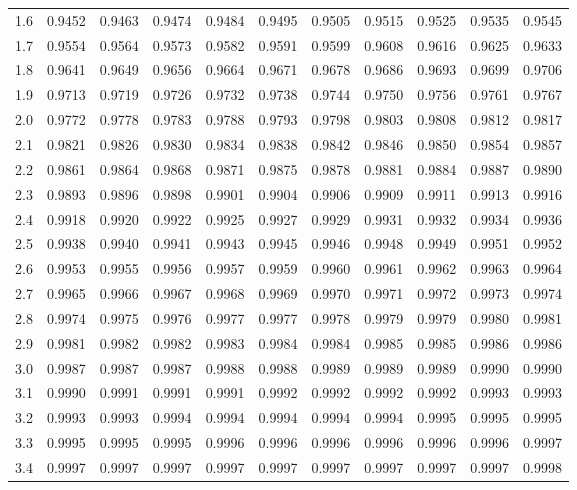\begin{small}
\begin{center}
\begin{tabular}{|l|cccccccccc|}
1.6&0.9452&0.9463&0.9474&0.9484&0.9495&0.9505&0.9515&0.9525&0.9535&0.9545\\
1.7&0.9554&0.9564&0.9573&0.9582&0.9591&0.9599&0.9608&0.9616&0.9625&0.9633\\
1.8&0.9641&0.9649&0.9656&0.9664&0.9671&0.9678&0.9686&0.9693&0.9699&0.9706\\
1.9&0.9713&0.9719&0.9726&0.9732&0.9738&0.9744&0.9750&0.9756&0.9761&0.9767\\[6pt]
2.0&0.9772&0.9778&0.9783&0.9788&0.9793&0.9798&0.9803&0.9808&0.9812&0.9817\\
2.1&0.9821&0.9826&0.9830&0.9834&0.9838&0.9842&0.9846&0.9850&0.9854&0.9857\\
2.2&0.9861&0.9864&0.9868&0.9871&0.9875&0.9878&0.9881&0.9884&0.9887&0.9890\\
2.3&0.9893&0.9896&0.9898&0.9901&0.9904&0.9906&0.9909&0.9911&0.9913&0.9916\\
2.4&0.9918&0.9920&0.9922&0.9925&0.9927&0.9929&0.9931&0.9932&0.9934&0.9936\\
2.5&0.9938&0.9940&0.9941&0.9943&0.9945&0.9946&0.9948&0.9949&0.9951&0.9952\\
2.6&0.9953&0.9955&0.9956&0.9957&0.9959&0.9960&0.9961&0.9962&0.9963&0.9964\\
2.7&0.9965&0.9966&0.9967&0.9968&0.9969&0.9970&0.9971&0.9972&0.9973&0.9974\\
2.8&0.9974&0.9975&0.9976&0.9977&0.9977&0.9978&0.9979&0.9979&0.9980&0.9981\\
2.9&0.9981&0.9982&0.9982&0.9983&0.9984&0.9984&0.9985&0.9985&0.9986&0.9986\\[6pt]
3.0&0.9987&0.9987&0.9987&0.9988&0.9988&0.9989&0.9989&0.9989&0.9990&0.9990\\
3.1&0.9990&0.9991&0.9991&0.9991&0.9992&0.9992&0.9992&0.9992&0.9993&0.9993\\
3.2&0.9993&0.9993&0.9994&0.9994&0.9994&0.9994&0.9994&0.9995&0.9995&0.9995\\
3.3&0.9995&0.9995&0.9995&0.9996&0.9996&0.9996&0.9996&0.9996&0.9996&0.9997\\
3.4&0.9997&0.9997&0.9997&0.9997&0.9997&0.9997&0.9997&0.9997&0.9997&0.9998\\
\hline
\end{tabular}
\end{center}
\end{small}


